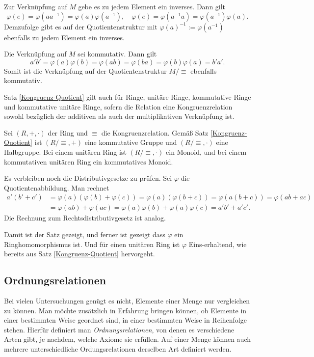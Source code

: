 Zur Verknüpfung auf $M$ gebe es zu jedem Element ein inverses. Dann gilt
\[\varphi(e) = \varphi(aa^{-1}) = \varphi(a)\varphi(a^{-1}),\quad
\varphi(e) = \varphi(a^{-1}a) = \varphi(a^{-1})\varphi(a).\]
Demzufolge gibt es auf der Quotientenstruktur mit
$\varphi(a)^{-1}:=\varphi(a^{-1})$ ebenfalls zu jedem Element
ein inverses.

Die Verknüpfung auf $M$ sei kommutativ. Dann gilt
\[a'b' = \varphi(a)\varphi(b) = \varphi(ab) = \varphi(ba)
= \varphi(b)\varphi(a) = b'a'.\]
Somit ist die Verknüpfung auf der Quotientenstruktur $M/\equiv$ ebenfalls
kommutativ.\,\qedsymbol

\begin{Satz}\label{Kongruenz-Ring-Quotient}
Satz \ref{Kongruenz-Quotient} gilt auch für Ringe, unitäre Ringe,
kommutative Ringe und kommutative unitäre Ringe, sofern die
Relation eine Kongruenzrelation sowohl bezüglich der additiven
als auch der multiplikativen Verknüpfung ist.
\end{Satz}
 Sei $(R,+,\cdot)$ der Ring und $\equiv$ die
Kongruenzrelation. Gemäß Satz \ref{Kongruenz-Quotient} ist
$(R/\equiv,+)$ eine kommutative Gruppe und $(R/\equiv,\cdot)$
eine Halbgruppe. Bei einem unitären Ring ist $(R/\equiv,\cdot)$
ein Monoid, und bei einem kommutativen unitären Ring ein
kommutatives Monoid.

Es verbleiben noch die Distributivgesetze zu prüfen.
Sei $\varphi$ die Quotientenabbildung. Man rechnet
\begin{align*}
a'(b'+c') &= \varphi(a)(\varphi(b)+\varphi(c)) = \varphi(a)(\varphi(b+c))
= \varphi(a(b+c)) = \varphi(ab+ac)\\
&= \varphi(ab)+\varphi(ac) = \varphi(a)\varphi(b)+\varphi(a)\varphi(c)
= a'b'+a'c'.
\end{align*}
Die Rechnung zum Rechtsdistributivgesetz ist analog.

Damit ist der Satz gezeigt, und ferner ist gezeigt dass $\varphi$ ein
Ringhomomorphismus ist. Und für einen unitären Ring ist $\varphi$
Eins-erhaltend, wie bereits aus Satz \ref{Kongruenz-Quotient}
hervorgeht.\,\qedsymbol

\subsection{Ordnungsrelationen}

Bei vielen Untersuchungen genügt es nicht, Elemente einer Menge
nur vergleichen zu können. Man möchte zusätzlich in Erfahrung
bringen können, ob Elemente in einer bestimmten Weise geordnet
sind, in einer bestimmten Weise in Reihenfolge stehen. Hierfür definiert
man \emph{Ordnungsrelationen}, von denen es
verschiedene Arten gibt, je nachdem, welche Axiome sie erfüllen. Auf
einer Menge können auch mehrere unterschiedliche Ordungsrelationen
derselben Art definiert werden.

